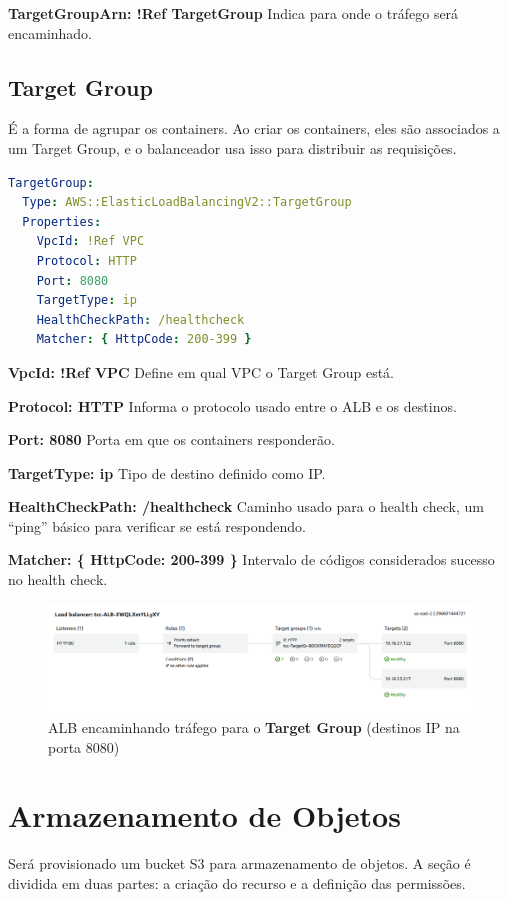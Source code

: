 \textbf{TargetGroupArn: !Ref TargetGroup} Indica para onde o tráfego será encaminhado.

\subsection{Target Group}
É a forma de agrupar os containers. Ao criar os containers, eles são associados a um Target Group, e o balanceador usa isso para distribuir as requisições.\\

\begin{lstlisting}[language=YAML]
TargetGroup:
  Type: AWS::ElasticLoadBalancingV2::TargetGroup
  Properties:
    VpcId: !Ref VPC
    Protocol: HTTP
    Port: 8080
    TargetType: ip
    HealthCheckPath: /healthcheck
    Matcher: { HttpCode: 200-399 }
\end{lstlisting}

\textbf{VpcId: !Ref VPC} Define em qual VPC o Target Group está.

\textbf{Protocol: HTTP} Informa o protocolo usado entre o ALB e os destinos.

\textbf{Port: 8080} Porta em que os containers responderão.

\textbf{TargetType: ip} Tipo de destino definido como IP.

\textbf{HealthCheckPath: /healthcheck} Caminho usado para o health check, um “ping” básico para verificar se está respondendo.

\textbf{Matcher: \{ HttpCode: 200-399 \}} Intervalo de códigos considerados sucesso no health check.

\begin{figure}[H]
\centering
\caption{ALB encaminhando tráfego para o \textbf{Target Group} (destinos IP na porta 8080)}
\label{fig:load-balancer}
\includegraphics[scale=0.4]{imagens/targets.png}
\end{figure}

\section{Armazenamento de Objetos}
Será provisionado um bucket S3 para armazenamento de objetos. 
A seção é dividida em duas partes: a criação do recurso e a definição das permissões.\\

